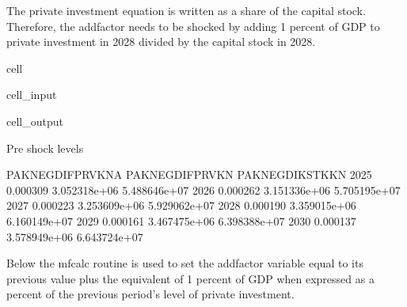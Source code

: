 \documentclass[letterpaper,10pt,english]{jupyterBook}
\begin{document}
\sphinxAtStartPar
The private investment equation is written as a share of the capital stock.  Therefore, the add\sphinxhyphen{}factor needs to be shocked by adding 1 percent of GDP to private investment in 2028 divided by the capital stock in 2028.

\begin{sphinxuseclass}{cell}\begin{sphinxVerbatimInput}

\begin{sphinxuseclass}{cell_input}
\begin{sphinxVerbatim}[commandchars=\\\{\}]

\PYG{p}{[}\PYG{p}{[}\PYG{p}{]}\PYG{p}{]}

\end{sphinxVerbatim}

\end{sphinxuseclass}\end{sphinxVerbatimInput}
\begin{sphinxVerbatimOutput}

\begin{sphinxuseclass}{cell_output}
\begin{sphinxVerbatim}[commandchars=\\\{\}]
Pre shock levels
\end{sphinxVerbatim}

\begin{sphinxVerbatim}[commandchars=\\\{\}]
      PAKNEGDIFPRVKN\PYGZus{}A  PAKNEGDIFPRVKN  PAKNEGDIKSTKKN
2025         \PYGZhy{}0.000309    3.052318e+06    5.488646e+07
2026         \PYGZhy{}0.000262    3.151336e+06    5.705195e+07
2027         \PYGZhy{}0.000223    3.253609e+06    5.929062e+07
2028         \PYGZhy{}0.000190    3.359015e+06    6.160149e+07
2029         \PYGZhy{}0.000161    3.467475e+06    6.398388e+07
2030         \PYGZhy{}0.000137    3.578949e+06    6.643724e+07
\end{sphinxVerbatim}

\end{sphinxuseclass}\end{sphinxVerbatimOutput}

\end{sphinxuseclass}
\sphinxAtStartPar
Below the mfcalc routine is used to set the addfactor variable equal to its previous value plus the equivalent of 1 percent of GDP when expressed as a percent of the previous period’s level of private investment.
\end{document}
